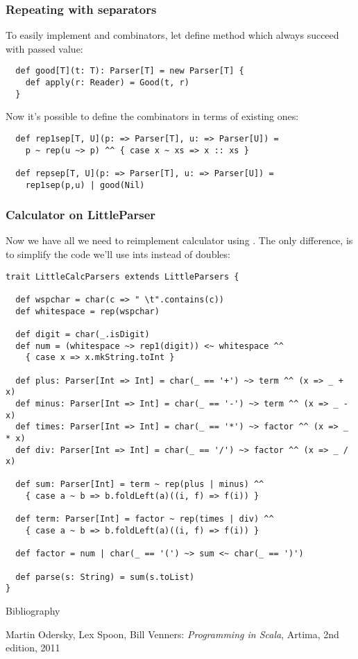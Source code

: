 \documentclass[t]{beamer}
\begin{document}
\begin{frame}[fragile]
\frametitle{Repeating with separators}
To easily implement  and  combinators, let define
method  which always succeed with passed value:

\begin{lstlisting}
  def good[T](t: T): Parser[T] = new Parser[T] {
    def apply(r: Reader) = Good(t, r)
  }
\end{lstlisting}

Now it's possible to define the combinators in terms of existing ones:

\begin{lstlisting}
  def rep1sep[T, U](p: => Parser[T], u: => Parser[U]) =
    p ~ rep(u ~> p) ^^ { case x ~ xs => x :: xs }

  def repsep[T, U](p: => Parser[T], u: => Parser[U]) =
    rep1sep(p,u) | good(Nil)
\end{lstlisting}
\end{frame}

\begin{frame}[fragile]
\frametitle{Calculator on LittleParser}
Now we have all we need to reimplement calculator using .
The only difference, is to simplify the code we'll use ints instead of doubles:
\begin{lstlisting}
trait LittleCalcParsers extends LittleParsers {

  def wspchar = char(c => " \t".contains(c))
  def whitespace = rep(wspchar)

  def digit = char(_.isDigit)
  def num = (whitespace ~> rep1(digit)) <~ whitespace ^^
    { case x => x.mkString.toInt }

  def plus: Parser[Int => Int] = char(_ == '+') ~> term ^^ (x => _ + x)
  def minus: Parser[Int => Int] = char(_ == '-') ~> term ^^ (x => _ - x)
  def times: Parser[Int => Int] = char(_ == '*') ~> factor ^^ (x => _ * x)
  def div: Parser[Int => Int] = char(_ == '/') ~> factor ^^ (x => _ / x)

  def sum: Parser[Int] = term ~ rep(plus | minus) ^^
    { case a ~ b => b.foldLeft(a)((i, f) => f(i)) }

  def term: Parser[Int] = factor ~ rep(times | div) ^^
    { case a ~ b => b.foldLeft(a)((i, f) => f(i)) }

  def factor = num | char(_ == '(') ~> sum <~ char(_ == ')')

  def parse(s: String) = sum(s.toList)
}
\end{lstlisting}
\end{frame}

\begin{frame}{Bibliography}
\begin{thebibliography}{00}
Martin Odersky, Lex Spoon, Bill Venners:
\emph{Programming in Scala},
Artima, 2nd edition, 2011
\end{thebibliography}
\end{frame}


\end{document}
